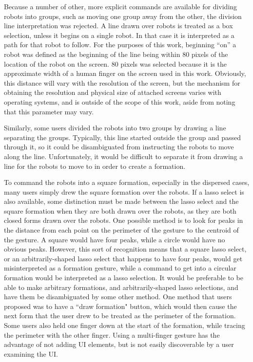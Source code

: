 Because a number of other, more explicit commands are available for dividing robots into groups, such as moving one group away from the other, the division line interpretation was rejected. 
A line drawn over robots is treated as a box selection, unless it begins on a single robot. 
In that case it is interpreted as a path for that robot to follow. 
For the purposes of this work, beginning ``on'' a robot was defined as the beginning of the line being within 80 pixels of the location of the robot on the screen. 
80 pixels was selected because it is the approximate width of a human finger on the screen used in this work. 
Obviously, this distance will vary with the resolution of the screen, but the mechanism for obtaining the resolution and physical size of attached screens varies with operating systems, and is outside of the scope of this work, aside from noting that this parameter may vary.

Similarly, some users divided the robots into two groups by drawing a line separating the groups.
Typically, this line started outside the group and passed through it, so it could be disambiguated from instructing the robots to move along the line.
Unfortunately, it would be difficult to separate it from drawing a line for the robots to move to in order to create a formation.

To command the robots into a square formation, especially in the dispersed cases, many users simply drew the square formation over the robots.
If a lasso select is also available, some distinction must be made between the lasso select and the square formation when they are both drawn over the robots, as they are both closed forms drawn over the robots.
One possible method is to look for peaks in the distance from each point on the perimeter of the gesture to the centroid of the gesture. 
A square would have four peaks, while a circle would have no obvious peaks. 
However, this sort of recognition means that a square lasso select, or an arbitrarily-shaped lasso select that happens to have four peaks, would get misinterpreted as a formation gesture, while a command to get into a circular formation would be interpreted as a lasso selection. 
It would be preferable to be able to make arbitrary formations, and arbitrarily-shaped lasso selections, and have them be disambiguated by some other method. 
One method that users proposed was to have a ``draw formation" button, which would then cause the next form that the user drew to be treated as the perimeter of the formation. 
Some users also held one finger down at the start of the formation, while tracing the perimeter with the other finger. 
Using a multi-finger gesture has the advantage of not adding UI elements, but is not easily discoverable by a user examining the UI. 

